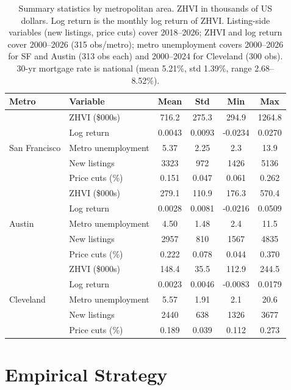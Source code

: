 \documentclass[12pt]{article}
\begin{document}
\begin{table}[H]
\centering
\small
\caption{Summary statistics by metropolitan area. ZHVI in thousands of US dollars. Log return is the monthly log return of ZHVI. Listing-side variables (new listings, price cuts) cover 2018--2026; ZHVI and log return cover 2000--2026 (315 obs/metro); metro unemployment covers 2000--2026 for SF and Austin (313 obs each) and 2000--2024 for Cleveland (300 obs). 30-yr mortgage rate is national (mean 5.21\%, std 1.39\%, range 2.68--8.52\%).}
\label{tab:summary}
\begin{tabular}{llcccc}
\hline
Metro & Variable & Mean & Std & Min & Max \\
\hline
\multirow{5}{*}{San Francisco}
  & ZHVI (\$000s)        & 716.2  & 275.3 & 294.9  & 1264.8 \\
  & Log return           & 0.0043 & 0.0093 & -0.0234 & 0.0270 \\
  & Metro unemployment   & 5.37  & 2.25  & 2.3    & 13.9   \\
  & New listings         & 3323  & 972   & 1426   & 5136   \\
  & Price cuts (\%)      & 0.151 & 0.047 & 0.061  & 0.262  \\
\hline
\multirow{5}{*}{Austin}
  & ZHVI (\$000s)        & 279.1  & 110.9 & 176.3  & 570.4  \\
  & Log return           & 0.0028 & 0.0081 & -0.0216 & 0.0509 \\
  & Metro unemployment   & 4.50  & 1.48  & 2.4    & 11.5   \\
  & New listings         & 2957  & 810   & 1567   & 4835   \\
  & Price cuts (\%)      & 0.222 & 0.078 & 0.044  & 0.370  \\
\hline
\multirow{5}{*}{Cleveland}
  & ZHVI (\$000s)        & 148.4  & 35.5  & 112.9  & 244.5  \\
  & Log return           & 0.0023 & 0.0046 & -0.0083 & 0.0179 \\
  & Metro unemployment   & 5.57  & 1.91  & 2.1    & 20.6   \\
  & New listings         & 2440  & 638   & 1326   & 3677   \\
  & Price cuts (\%)      & 0.189 & 0.039 & 0.112  & 0.273  \\
\hline
\end{tabular}
\end{table}

\section{Empirical Strategy}
\label{sec:method}
\end{document}
